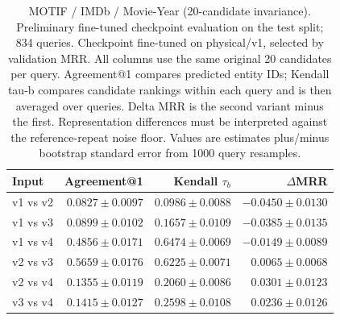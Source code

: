 \begin{table}[t]
\centering
\small
\begin{tabular}{lrrr}
\toprule
Input & Agreement@1 & Kendall $\tau_b$ & $\Delta$MRR \\
\midrule
v1 vs v2 & $0.0827 \pm 0.0097$ & $0.0986 \pm 0.0088$ & $-0.0450 \pm 0.0130$ \\
v1 vs v3 & $0.0899 \pm 0.0102$ & $0.1657 \pm 0.0109$ & $-0.0385 \pm 0.0135$ \\
v1 vs v4 & $0.4856 \pm 0.0171$ & $0.6474 \pm 0.0069$ & $-0.0149 \pm 0.0089$ \\
v2 vs v3 & $0.5659 \pm 0.0176$ & $0.6225 \pm 0.0071$ & $0.0065 \pm 0.0068$ \\
v2 vs v4 & $0.1355 \pm 0.0119$ & $0.2060 \pm 0.0086$ & $0.0301 \pm 0.0123$ \\
v3 vs v4 & $0.1415 \pm 0.0127$ & $0.2598 \pm 0.0108$ & $0.0236 \pm 0.0126$ \\
\bottomrule
\end{tabular}
\caption{MOTIF / IMDb / Movie-Year (20-candidate invariance). Preliminary fine-tuned checkpoint evaluation on the test split; 834 queries. Checkpoint fine-tuned on physical/v1, selected by validation MRR. All columns use the same original 20 candidates per query. Agreement@1 compares predicted entity IDs; Kendall tau-b compares candidate rankings within each query and is then averaged over queries. Delta MRR is the second variant minus the first. Representation differences must be interpreted against the reference-repeat noise floor. Values are estimates plus/minus bootstrap standard error from 1000 query resamples.}
\label{tab:motif-movie_year-invariance}
\end{table}
